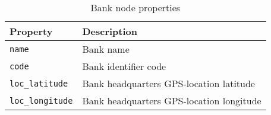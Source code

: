 \begin{table}[H]
    \centering
      \begin{tabular}{|l|l|}
      \hline
      \textbf{Property}        & \textbf{Description}                                      \\ \hline
      \texttt{name}         & Bank name                                                 \\ \hline
      \texttt{code}         & Bank identifier code                                      \\ \hline
      \texttt{loc\_latitude}  & Bank headquarters GPS-location latitude                   \\ \hline
      \texttt{loc\_longitude} & Bank headquarters GPS-location longitude                  \\ \hline
      \end{tabular}
    \caption{Bank node properties}
    \label{table:bank-node-properties}
\end{table}